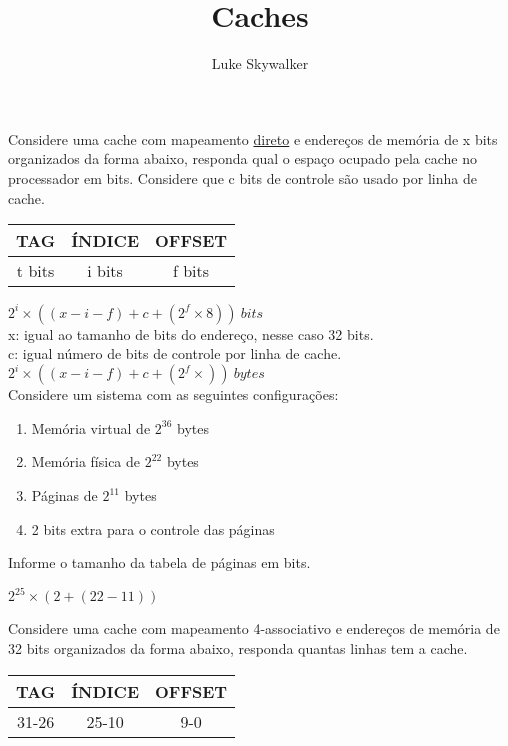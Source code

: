\documentclass{article}
\author{Luke Skywalker}
\title{Caches}
\begin{document}
\maketitle

Considere uma cache com mapeamento \underline{direto} e endereços de memória de
x bits organizados da forma abaixo, responda qual o espaço ocupado pela cache no
processador em bits. Considere que c bits de controle são usado por linha de
cache.

\begin{table}[ht!]
  \begin{tabular}{|c|c|c|}
    \hline TAG & ÍNDICE & OFFSET \\
    \hline t bits & i bits & f bits \\
    \hline
  \end{tabular}
\end{table}

$2^{i}\times((x-i-f)+c+(2^{f} \times 8))\ bits$\\
\small{x: igual ao tamanho de bits do endereço, nesse caso 32 bits.}\\
\small{c: igual  número de bits de controle por linha de cache.}\\

$2^{i}\times((x-i-f)+c+(2^{f} \times))\ bytes$\\

Considere um sistema com as seguintes configurações:

\begin{enumerate}
\item Memória virtual de $2^{36}$ bytes
\item Memória física de $2^{22}$ bytes
\item Páginas de $2^{11}$ bytes
\item 2 bits extra para o controle das páginas
\end{enumerate}

Informe o tamanho da tabela de páginas em bits.

$2^{25}\times(2+(22-11))$

Considere uma cache com mapeamento 4-associativo e endereços de memória de 32
bits organizados da forma abaixo, responda quantas linhas tem a cache.

\begin{tabular}{|c|c|c|}
\hline TAG & ÍNDICE & OFFSET \\
\hline 31-26 & 25-10 & 9-0 \\
\hline
\end{tabular}
\end{document}
